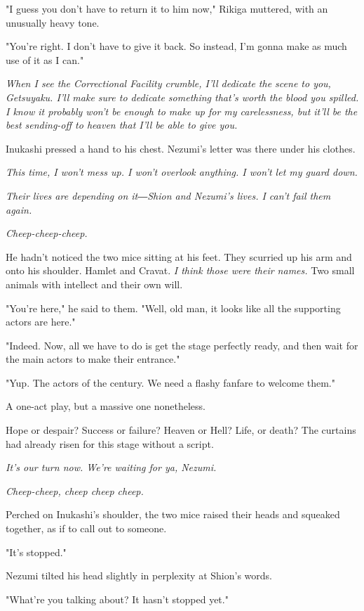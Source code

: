 "I guess you don't have to return it to him now," Rikiga muttered, with
an unusually heavy tone.

"You're right. I don't have to give it back. So instead, I'm gonna make
as much use of it as I can."

\emph{When I see the Correctional Facility crumble, I'll dedicate the scene to
you, Getsuyaku. I'll make sure to dedicate something that's worth the
blood you spilled. I know it probably won't be enough to make up for my
carelessness, but it'll be the best sending-off to heaven that I'll be
able to give you.}

Inukashi pressed a hand to his chest. Nezumi's letter was there under
his clothes.

\emph{This time, I won't mess up. I won't overlook anything. I won't let my
guard down.}

\emph{Their lives are depending on it―Shion and Nezumi's lives. I can't fail
them again.}

\emph{Cheep-cheep-cheep.}

He hadn't noticed the two mice sitting at his feet. They scurried up his
arm and onto his shoulder. Hamlet and Cravat. \emph{I think those were their
names.} Two small animals with intellect and their own will.

"You're here," he said to them. "Well, old man, it looks like all the
supporting actors are here."

"Indeed. Now, all we have to do is get the stage perfectly ready, and
then wait for the main actors to make their entrance."

"Yup. The actors of the century. We need a flashy fanfare to welcome
them."

A one-act play, but a massive one nonetheless.

Hope or despair? Success or failure? Heaven or Hell? Life, or death? The
curtains had already risen for this stage without a script.

\emph{It's our turn now. We're waiting for ya, Nezumi.}

\emph{Cheep-cheep, cheep cheep cheep.}

Perched on Inukashi's shoulder, the two mice raised their heads and
squeaked together, as if to call out to someone.

\myspace

"It's stopped."

Nezumi tilted his head slightly in perplexity at Shion's words.

"What're you talking about? It hasn't stopped yet."

